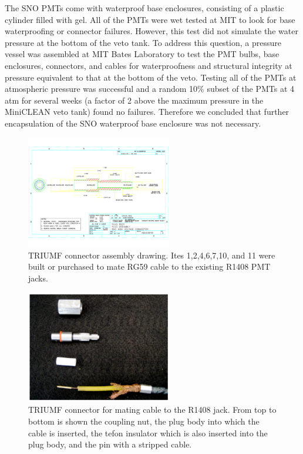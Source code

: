 \documentclass{JINST}
\begin{document}
The SNO PMTs come with waterproof base enclosures, consisting of a
plastic cylinder filled with gel.  All of the PMTs were wet tested at
MIT to look for base waterproofing or connector failures.  However,
this test did not simulate the water pressure at the bottom of the
veto tank.  To address this question, a pressure vessel was assembled
at MIT Bates Laboratory to test the PMT bulbs, base enclosures, connectors, and
cables for waterproofness and structural integrity at pressure
equivalent to that at the bottom of the veto. Testing
all of the PMTs at atmospheric pressure was successful and a random
10\% subset of the PMTs at 4 atm for several weeks (a factor of 2
above the maximum pressure in the MiniCLEAN veto tank) found no
failures.  Therefore we concluded that further encapsulation of the
SNO waterproof base enclosure was not necessary.

\begin{figure}[ht]
\begin{center}
\includegraphics[width=2.5in,page=13]{graphics/snoConnectorDrawings.pdf}
\caption{TRIUMF connector assembly drawing.  Ites 1,2,4,6,7,10, and 11 were built or purchased to mate RG59 cable to the existing R1408 PMT jacks.
\label{fig:connectordrawing}}
\end{center}
\end{figure}

\begin{figure}[ht]
\begin{center}
\includegraphics[width=2.5in]{graphics/connectorpic.pdf}
\caption{TRIUMF connector for mating cable to the R1408 jack.  From top to bottom is shown the coupling nut, the plug body into which the cable is inserted, the tefon insulator which is also inserted into the plug body, and the pin with a stripped cable.
\label{fig:connectorpic}}
\end{center}
\end{figure}
\end{document}
